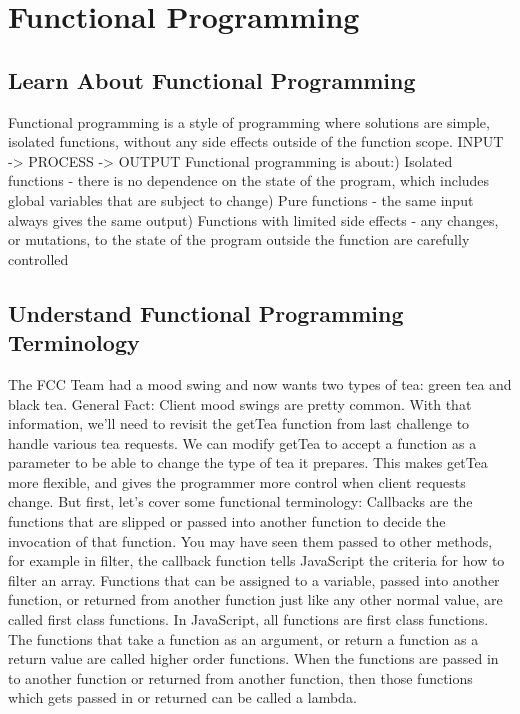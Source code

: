 \documentclass{article}%
\begin{document}
%
\newpage%
\section{Functional Programming}%
\label{sec:FunctionalProgramming}%
\subsection{Learn About Functional Programming}%
\label{subsec:LearnAboutFunctionalProgramming}%
Functional programming is a style of programming where solutions are simple, isolated functions, without any side effects outside of the function scope.\newline%
INPUT {-}> PROCESS {-}> OUTPUT\newline%
Functional programming is about:) Isolated functions {-} there is no dependence on the state of the program, which includes global variables that are subject to change) Pure functions {-} the same input always gives the same output) Functions with limited side effects {-} any changes, or mutations, to the state of the program outside the function are carefully controlled\newline%

%
\subsection{Understand Functional Programming Terminology}%
\label{subsec:UnderstandFunctionalProgrammingTerminology}%
The FCC Team had a mood swing and now wants two types of tea: green tea and black tea. General Fact: Client mood swings are pretty common.\newline%
With that information, we'll need to revisit the getTea function from last challenge to handle various tea requests. We can modify getTea to accept a function as a parameter to be able to change the type of tea it prepares. This makes getTea more flexible, and gives the programmer more control when client requests change.\newline%
But first, let's cover some functional terminology:\newline%
Callbacks are the functions that are slipped or passed into another function to decide the invocation of that function. You may have seen them passed to other methods, for example in filter, the callback function tells JavaScript the criteria for how to filter an array.\newline%
Functions that can be assigned to a variable, passed into another function, or returned from another function just like any other normal value, are called first class functions. In JavaScript, all functions are first class functions.\newline%
The functions that take a function as an argument, or return a function as a return value are called higher order functions.\newline%
When the functions are passed in to another function or returned from another function, then those functions which gets passed in or returned can be called a lambda.\newline%
\end{document}

